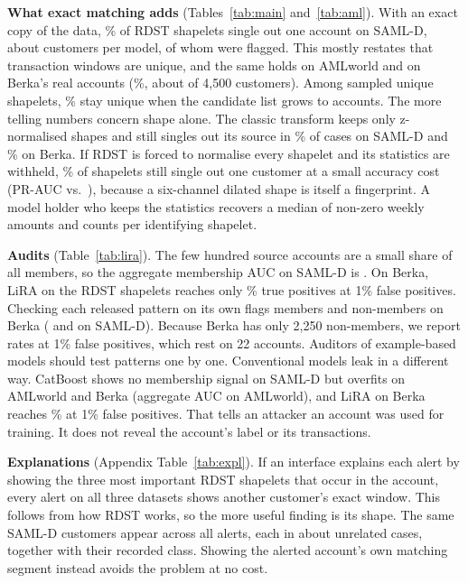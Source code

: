 \documentclass[sigconf,anonymous]{acmart}
\begin{document}
\textbf{What exact matching adds} (Tables~\ref{tab:main} and~\ref{tab:aml}). With an exact copy of the data, \rdstUnique\% of RDST shapelets single out one account on SAML-D, about \rdstCust{} customers per model, of whom \rdstSusp{} were flagged. This mostly restates that transaction windows are unique, and the same holds on AMLworld and on Berka's real accounts (\berkaUnique\%, about \berkaCust{} of 4,500 customers). Among sampled unique shapelets, \scaleKeep\% stay unique when the candidate list grows to \scaleN{} accounts. The more telling numbers concern shape alone. The classic transform keeps only z-normalised shapes and still singles out its source in \stcUnique\% of cases on SAML-D and \berkaStcUnique\% on Berka. If RDST is forced to normalise every shapelet and its statistics are withheld, \rdnUnique\% of shapelets still single out one customer at a small accuracy cost (PR-AUC \rdnPR{} vs.\ \rdstPR), because a six-channel dilated shape is itself a fingerprint. A model holder who keeps the statistics recovers a median of \rdstCells{} non-zero weekly amounts and counts per identifying shapelet.



\textbf{Audits} (Table~\ref{tab:lira}). The few hundred source accounts are a small share of all members, so the aggregate membership AUC on SAML-D is \rdstMIA. On Berka, LiRA on the RDST shapelets reaches only \liraRdstShpTpr\% true positives at 1\% false positives. Checking each released pattern on its own flags \auditBerkaMembers{} members and \auditBerkaNon{} non-members on Berka (\auditMembers{} and \auditNonmembers{} on SAML-D). Because Berka has only 2,250 non-members, we report rates at 1\% false positives, which rest on 22 accounts. Auditors of example-based models should test patterns one by one. Conventional models leak in a different way. CatBoost shows no membership signal on SAML-D but overfits on AMLworld and Berka (aggregate AUC \amlCbMIA{} on AMLworld), and LiRA on Berka reaches \liraCbFullTpr\% at 1\% false positives. That tells an attacker an account was used for training. It does not reveal the account's label or its transactions.

\textbf{Explanations} (Appendix Table~\ref{tab:expl}). If an interface explains each alert by showing the three most important RDST shapelets that occur in the account, every alert on all three datasets shows another customer's exact window. This follows from how RDST works, so the more useful finding is its shape. The same \explCustSamld{} SAML-D customers appear across all \explAlertsSamld{} alerts, each in about \explShownSamld{} unrelated cases, together with their recorded class. Showing the alerted account's own matching segment instead avoids the problem at no cost.
\end{document}
